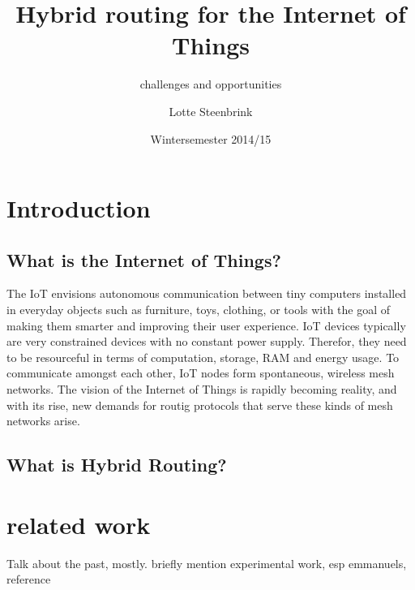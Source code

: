 \documentclass[a4paper,10pt]{scrartcl}
\begin{document}
\title{Hybrid routing for the Internet of Things}
\subtitle{challenges and opportunities}
\author{Lotte Steenbrink}
\date{Wintersemester 2014/15}
\maketitle

\begin{abstract}


\end{abstract}

\section{Introduction}
\label{sec:Intro}

\subsection{What is the Internet of Things?}
\label{subsec:IoT}
The \gls{IoT} envisions autonomous communication between tiny computers installed in everyday objects such as furniture, toys, clothing, or tools with the goal of making them smarter and improving their user experience. IoT devices typically are very constrained devices with no constant power supply. Therefor, they need to be resourceful in terms of computation, storage, RAM and energy usage.
To communicate amongst each other, IoT nodes form spontaneous, wireless mesh networks.
The vision of the Internet of Things is rapidly becoming reality, and with its rise, new demands for routig protocols that serve these kinds of mesh networks arise.


\subsection{What is Hybrid Routing?}
\label{subsec:hybrid}


\section{related work}
\label{sec:related_work}
Talk about the past, mostly. briefly mention experimental work, esp emmanuels, reference 
\end{document}
